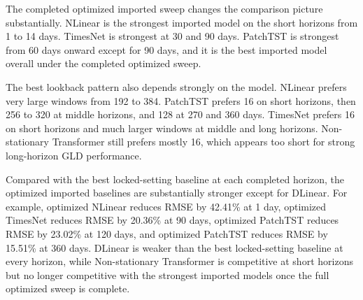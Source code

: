 The completed optimized imported sweep changes the comparison picture substantially.
NLinear is the strongest imported model on the short horizons from 1 to 14 days.
TimesNet is strongest at 30 and 90 days.
PatchTST is strongest from 60 days onward except for 90 days, and it is the best imported model overall under the completed optimized sweep.

The best lookback pattern also depends strongly on the model.
NLinear prefers very large windows from 192 to 384.
PatchTST prefers 16 on short horizons, then 256 to 320 at middle horizons, and 128 at 270 and 360 days.
TimesNet prefers 16 on short horizons and much larger windows at middle and long horizons.
Non-stationary Transformer still prefers mostly 16, which appears too short for strong long-horizon GLD performance.

Compared with the best locked-setting baseline at each completed horizon, the optimized imported baselines are substantially stronger except for DLinear.
For example, optimized NLinear reduces RMSE by 42.41\% at 1 day, optimized TimesNet reduces RMSE by 20.36\% at 90 days, optimized PatchTST reduces RMSE by 23.02\% at 120 days, and optimized PatchTST reduces RMSE by 15.51\% at 360 days.
DLinear is weaker than the best locked-setting baseline at every horizon, while Non-stationary Transformer is competitive at short horizons but no longer competitive with the strongest imported models once the full optimized sweep is complete.
